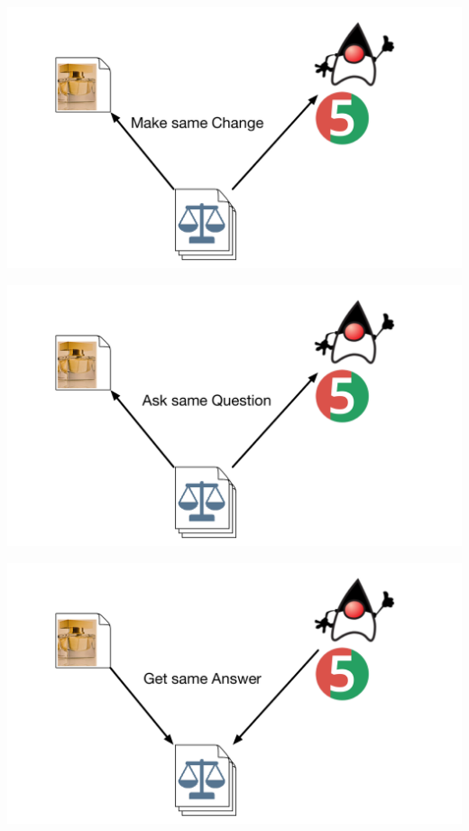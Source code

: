 \begin{frame}[fragile]{}

\includegraphics[width=\textwidth]{images/Comparison-2.pdf}

\end{frame}

\begin{frame}[fragile]{}

\includegraphics[width=\textwidth]{images/Comparison-3.pdf}

\end{frame}

\begin{frame}[fragile]{}

\includegraphics[width=\textwidth]{images/Comparison-4.pdf}

\end{frame}


